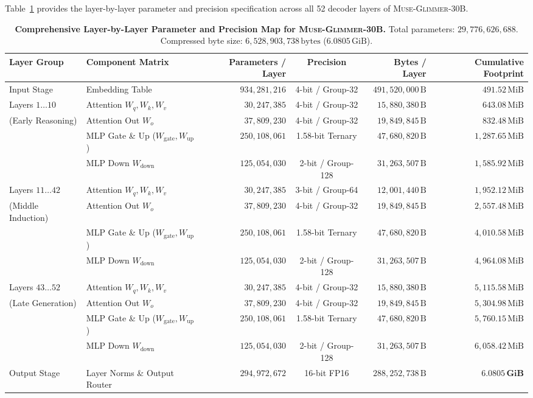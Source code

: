 \documentclass[10pt,twocolumn,letterpaper]{article}
\newcommand{\modelname}{\textsc{Muse-Glimmer-30B}}
\begin{document}
Table~\ref{tab:full_layer_breakdown} provides the layer-by-layer parameter and precision specification across all 52 decoder layers of \modelname{}.

\begin{table}[t]
\centering
\small
\caption{\textbf{Comprehensive Layer-by-Layer Parameter and Precision Map for \modelname{}.} Total parameters: $29,776,626,688$. Compressed byte size: $6,528,903,738\,\text{bytes}$ ($6.0805\,\text{GiB}$).}
\label{tab:full_layer_breakdown}
\begin{tabularx}{\textwidth}{p{2.8cm} X r c r r}
\toprule
\textbf{Layer Group} & \textbf{Component Matrix} & \textbf{Parameters / Layer} & \textbf{Precision} & \textbf{Bytes / Layer} & \textbf{Cumulative Footprint} \\
\midrule
Input Stage & Embedding Table & $934,281,216$ & 4-bit / Group-32 & $491,520,000\,\text{B}$ & $491.52\,\text{MiB}$ \\
\midrule
Layers $1 \dots 10$ & Attention $W_q, W_k, W_v$ & $30,247,385$ & 4-bit / Group-32 & $15,880,380\,\text{B}$ & $643.08\,\text{MiB}$ \\
(Early Reasoning) & Attention Out $W_o$ & $37,809,230$ & 4-bit / Group-32 & $19,849,845\,\text{B}$ & $832.48\,\text{MiB}$ \\
& MLP Gate \& Up ($W_{\text{gate}}, W_{\text{up}}$) & $250,108,061$ & 1.58-bit Ternary & $47,680,820\,\text{B}$ & $1,287.65\,\text{MiB}$ \\
& MLP Down $W_{\text{down}}$ & $125,054,030$ & 2-bit / Group-128 & $31,263,507\,\text{B}$ & $1,585.92\,\text{MiB}$ \\
\midrule
Layers $11 \dots 42$ & Attention $W_q, W_k, W_v$ & $30,247,385$ & 3-bit / Group-64 & $12,001,440\,\text{B}$ & $1,952.12\,\text{MiB}$ \\
(Middle Induction) & Attention Out $W_o$ & $37,809,230$ & 4-bit / Group-32 & $19,849,845\,\text{B}$ & $2,557.48\,\text{MiB}$ \\
& MLP Gate \& Up ($W_{\text{gate}}, W_{\text{up}}$) & $250,108,061$ & 1.58-bit Ternary & $47,680,820\,\text{B}$ & $4,010.58\,\text{MiB}$ \\
& MLP Down $W_{\text{down}}$ & $125,054,030$ & 2-bit / Group-128 & $31,263,507\,\text{B}$ & $4,964.08\,\text{MiB}$ \\
\midrule
Layers $43 \dots 52$ & Attention $W_q, W_k, W_v$ & $30,247,385$ & 4-bit / Group-32 & $15,880,380\,\text{B}$ & $5,115.58\,\text{MiB}$ \\
(Late Generation) & Attention Out $W_o$ & $37,809,230$ & 4-bit / Group-32 & $19,849,845\,\text{B}$ & $5,304.98\,\text{MiB}$ \\
& MLP Gate \& Up ($W_{\text{gate}}, W_{\text{up}}$) & $250,108,061$ & 1.58-bit Ternary & $47,680,820\,\text{B}$ & $5,760.15\,\text{MiB}$ \\
& MLP Down $W_{\text{down}}$ & $125,054,030$ & 2-bit / Group-128 & $31,263,507\,\text{B}$ & $6,058.42\,\text{MiB}$ \\
\midrule
Output Stage & Layer Norms \& Output Router & $294,972,672$ & 16-bit FP16 & $288,252,738\,\text{B}$ & $\mathbf{6.0805\,\text{GiB}}$ \\
\bottomrule
\end{tabularx}
\end{table}
\end{document}
